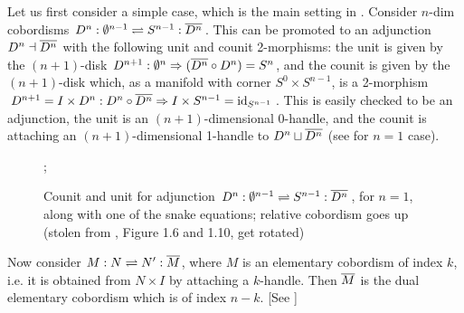 \documentclass[12pt]{article}
\newcommand{\disk}[1]{{D^{#1}}}
\newcommand{\sphr}[1]{{S^{#1}}}
\newcommand{\empt}[1]{{\emptyset^{#1}}}
\begin{document}
Let us first consider a simple case,
which is the main setting in .
Consider $n$-dim cobordisms
$\disk{n}: \empt{n-1} \rightleftharpoons
	\sphr{n-1}: \ov{\disk{n}}$.
This can be promoted to an adjunction
$\disk{n} \dashv \ov{\disk{n}}$
with the following unit and counit 2-morphisms:
the unit is given by the $(n+1)$-disk
$\disk{n+1}: \empt{n} \Rightarrow
	(\ov{\disk{n}} \circ \disk{n}) = \sphr{n}$,
and the counit is given by the $(n+1)$-disk which,
as a manifold with corner $\sphr{0} \times \sphr{n-1}$,
is a 2-morphism
$\disk{n+1} = I \times \disk{n}: \disk{n} \circ \ov{\disk{n}}
	\Rightarrow I \times \sphr{n-1} = \id_{\sphr{n-1}}$.
This is easily checked to be an adjunction,
the unit is an $(n+1)$-dimensional 0-handle,
and the counit is attaching an $(n+1)$-dimensional 1-handle
to $\disk{n} \sqcup \ov{\disk{n}}$
(see  for $n=1$ case).

\begin{figure}[ht]
\hspace{20pt};
\hspace{20pt}
\caption{Counit and unit for adjunction
$\disk{n}: \empt{n-1} \rightleftharpoons
	\sphr{n-1}: \ov{\disk{n}}$,
for $n=1$,
along with one of the snake equations;
relative cobordism goes up
(stolen from \cite{SPries},
Figure 1.6 and 1.10, get rotated)}
\label{f:disk-adjunction}
\end{figure}


Now consider $M: N \rightleftharpoons N': \overline{M}$,
where $M$ is an elementary cobordism of index $k$,
i.e. it is obtained from $N \times I$
by attaching a $k$-handle.
Then $\overline{M}$ is the dual elementary cobordism
which is of index $n-k$.
[See ]
\end{document}
